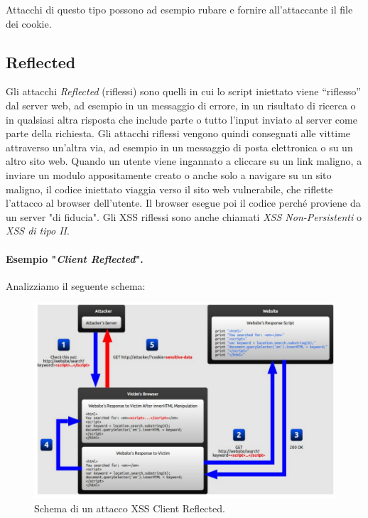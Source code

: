 Attacchi di questo tipo possono ad esempio rubare e
fornire all'attaccante il file dei cookie.

\subsection{Reflected}

Gli attacchi \textit{Reflected} (riflessi) sono quelli in cui lo script iniettato
viene “riflesso” dal server web, ad
esempio in un messaggio di errore, in un risultato di ricerca o in qualsiasi altra
risposta che
include parte o tutto l'input inviato al server come parte della richiesta.
Gli attacchi riflessi
vengono quindi consegnati alle vittime attraverso un'altra via, ad esempio in un
messaggio di
posta elettronica o su un altro sito web.
Quando un utente viene ingannato a cliccare su un link maligno, a inviare un modulo
appositamente creato o anche solo a navigare su un sito maligno, il codice
iniettato viaggia
verso il sito web vulnerabile, che riflette l'attacco al browser dell'utente.
Il browser esegue poi il codice perché proviene da un server "di fiducia".
Gli XSS riflessi
sono anche chiamati \textit{XSS Non-Persistenti} o \textit{XSS di tipo II}.

\paragraph{Esempio "\textit{Client Reflected}".}
Analizziamo il seguente schema:

\begin{figure}[H]
      \centering
      \includegraphics[width=\textwidth, keepaspectratio]{capitoli/secure_coding/img/cap_9/xss1.png}
      \caption{Schema di un attacco XSS Client Reflected.}
\end{figure}

